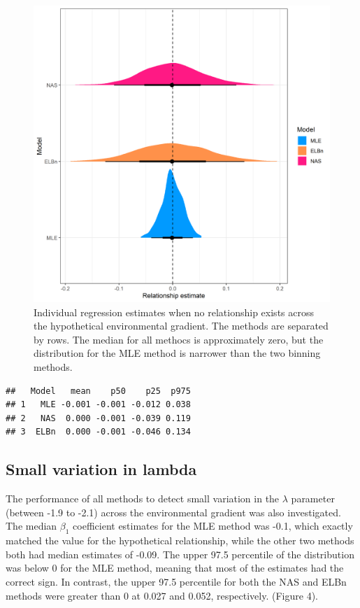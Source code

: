 \documentclass[
]{article}
\begin{document}
\begin{figure}
\centering
\includegraphics{figures/PLB_static_b_relationship_density.png}
\caption{Individual regression estimates when no relationship exists
across the hypothetical environmental gradient. The methods are
separated by rows. The median for all methocs is approximately zero, but
the distribution for the MLE method is narrower than the two binning
methods.}
\end{figure}

\begin{verbatim}
##   Model   mean    p50    p25  p975
## 1   MLE -0.001 -0.001 -0.012 0.038
## 2   NAS  0.000 -0.001 -0.039 0.119
## 3  ELBn  0.000 -0.001 -0.046 0.134
\end{verbatim}

\hypertarget{small-variation-in-lambda}{%
\subsection{Small variation in lambda}\label{small-variation-in-lambda}}

The performance of all methods to detect small variation in the
\(\lambda\) parameter (between -1.9 to -2.1) across the environmental
gradient was also investigated. The median \(\beta_1\) coefficient
estimates for the MLE method was -0.1, which exactly matched the value
for the hypothetical relationship, while the other two methods both had
median estimates of -0.09. The upper 97.5 percentile of the distribution
was below 0 for the MLE method, meaning that most of the estimates had
the correct sign. In contrast, the upper 97.5 percentile for both the
NAS and ELBn methods were greater than 0 at 0.027 and 0.052,
respectively. (Figure 4).
\end{document}
